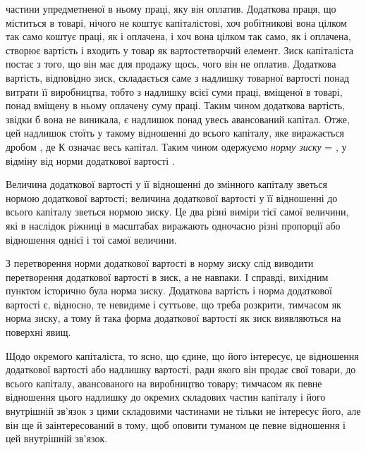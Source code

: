 \parcont{}  %
частини упредметненої в ньому праці, яку він оплатив. Додаткова
праця, що міститься в товарі, нічого не коштує капіталістові,
хоч робітникові вона цілком так само коштує праці, як
і оплачена, і хоч вона цілком так само, як і оплачена, створює
вартість і входить у товар як вартостетворчий елемент. Зиск
капіталіста постає з того, що він має для продажу щось, чого
він не оплатив. Додаткова вартість, відповідно зиск, складається
саме з надлишку товарної вартості понад витрати її виробництва,
тобто з надлишку всієї суми праці, вміщеної в товарі, понад
вміщену в ньому оплачену суму праці. Таким чином додаткова
вартість, звідки б вона не виникала, є надлишок понад увесь
авансований капітал. Отже, цей надлишок стоїть у такому відношенні
до всього капіталу, яке виражається дробом , де
$К$ означає весь капітал. Таким чином одержуємо \emph{норму зиску}
 = , у відміну від норми додаткової вартості .

Величина додаткової вартості у її відношенні до змінного
капіталу зветься нормою додаткової вартості; величина додаткової
вартості у її відношенні до всього капіталу зветься нормою зиску.
Це два різні виміри тієї самої величини, які в наслідок ріжниці в
масштабах виражають одночасно різні пропорції або відношення
однієї і тої самої величини.

З перетворення норми додаткової вартості в норму зиску
слід виводити перетворення додаткової вартості в зиск, а не
навпаки. І справді, вихідним пунктом історично була норма зиску.
Додаткова вартість і норма додаткової вартості є, відносно, те
невидиме і суттьове, що треба розкрити, тимчасом як норма
зиску, а тому й така форма додаткової вартості як зиск виявляються
на поверхні явищ.

Щодо окремого капіталіста, то ясно, що єдине, що його
інтересує, це відношення додаткової вартості або надлишку вартості,
ради якого він продає свої товари, до всього капіталу,
авансованого на виробництво товару; тимчасом як певне відношення
цього надлишку до окремих складових частин капіталу
і його внутрішній зв’язок з цими складовими частинами не тільки
не інтересує його, але він ще й заінтересований в тому, щоб
оповити туманом це певне відношення і цей внутрішній зв’язок.

